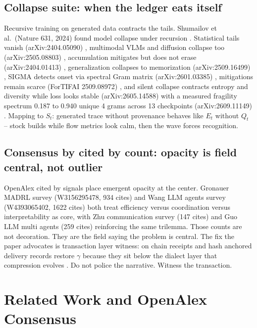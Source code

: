 \documentclass[11pt]{article}
\begin{document}
\subsection{Collapse suite: when the ledger eats itself}
Recursive training on generated data contracts the tails. Shumailov et al.\ (Nature 631, 2024) found model collapse under recursion \citep{shumailov2024}. Statistical tails vanish (arXiv:2404.05090) \citep{collapse2024tails}, multimodal VLMs and diffusion collapse too (arXiv:2505.08803) \citep{collapse2025multi}, accumulation mitigates but does not erase (arXiv:2404.01413) \citep{collapse2024accumulate}, generalization collapses to memorization (arXiv:2509.16499) \citep{collapse2025memorize}, SIGMA detects onset via spectral Gram matrix (arXiv:2601.03385) \citep{sigma2026}, mitigations remain scarce (ForTIFAI 2509.08972) \citep{fortifai2025}, and silent collapse contracts entropy and diversity while loss looks stable (arXiv:2605.14588) \citep{silent2025} with a measured fragility spectrum 0.187 to 0.940 unique 4 grams across 13 checkpoints (arXiv:2609.11149) \citep{fragility2025}. Mapping to $S_t$: generated trace without provenance behaves like $E_t$ without $Q_t$ -- stock builds while flow metrics look calm, then the wave forces recognition.

\subsection{Consensus by cited by count: opacity is field central, not outlier}
OpenAlex cited by signals place emergent opacity at the center. Gronauer MADRL survey (W3156295478, 934 cites) \citep{gronauer2022} and Wang LLM agents survey (W4393065402, 1622 cites) \citep{wang2024llmagents} both treat efficiency versus coordination versus interpretability as core, with Zhu communication survey (147 cites) and Guo LLM multi agents (259 cites) reinforcing the same trilemma. Those counts are not decoration. They are the field saying the problem is central. The fix the paper advocates is transaction layer witness: on chain receipts and hash anchored delivery records restore $\gamma$ because they sit below the dialect layer that compression evolves \citep{trm2026}. Do not police the narrative. Witness the transaction.

\section{Related Work and OpenAlex Consensus}
\label{sec:consensus}
\end{document}
